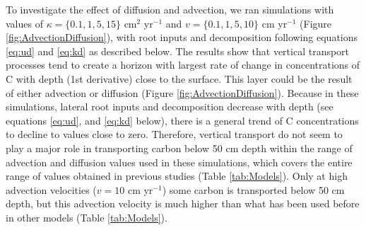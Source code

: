 \documentclass[11pt, oneside, a4paper]{article}   	%
\begin{document}
To investigate the effect of diffusion and advection, we ran simulations with values of $\kappa = \{0.1, 1, 5, 15\}$ cm$^2$ yr$^{-1}$ and $v = \{0.1, 1, 5, 10 \}$ cm yr$^{-1}$  (Figure \ref{fig:AdvectionDiffusion}), with root inputs and decomposition following equations \ref{eq:ud} and \ref{eq:kd} as described below. The results show that vertical transport processes tend to create a horizon with largest rate of change in concentrations of C with depth (1st derivative) close to the surface. This layer could be the result of either advection or diffusion (Figure \ref{fig:AdvectionDiffusion}). Because in these simulations, lateral root inputs and decomposition decrease with depth (see equations \ref{eq:ud}, and \ref{eq:kd} below), there is a general trend of C concentrations to decline to values close to zero. Therefore, vertical transport do not seem to play a major role in transporting carbon below 50 cm depth within the range of advection and diffusion values used in these simulations, which covers the entire range of values obtained in previous studies (Table \ref{tab:Models}). Only at high advection velocities ($v=10$ cm yr$^{-1}$) some carbon is transported below 50 cm depth, but this advection velocity is much higher than what has been used before in other models (Table \ref{tab:Models}).
\end{document}

